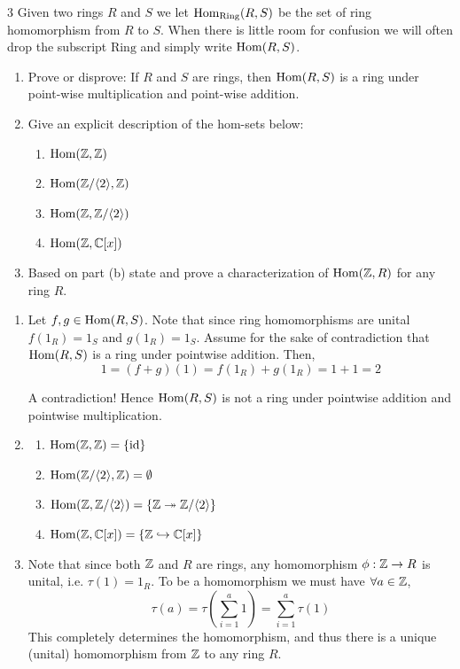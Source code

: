 \documentclass[Notebook.tex]{subfiles}
\begin{document}
\newpage

\begin{problem}{3}
    Given two rings $R$ and $S$ we let $\operatorname{Hom}_{\text{Ring}}(R,S)$ be the set of ring homomorphism from $R$ to $S$. When there is little room for confusion we will often drop the subscript $\text{Ring}$ and simply write $\operatorname{Hom}(R,S)$. 
    \begin{enumerate}[label=(\alph*),ref=\theenumi\alph*]
		\item Prove or disprove: If $R$ and $S$ are rings, then $\operatorname{Hom}(R,S)$ is a ring under point-wise multiplication and point-wise addition. 
		\item Give an explicit description of the hom-sets below:
		\begin{enumerate}
			\item $\operatorname{Hom}(\mathbb Z, \mathbb Z)$
			\item $\operatorname{Hom}(\mathbb Z/\langle 2 \rangle, \mathbb Z)$
			\item $\operatorname{Hom}(\mathbb Z, \mathbb Z/\langle 2 \rangle)$
			\item $\operatorname{Hom}(\mathbb Z, \mathbb C[x])$
		\end{enumerate}
		\item Based on part (b) state and prove a characterization of $\operatorname{Hom}(\mathbb Z,R)$ for any ring $R$. 
	\end{enumerate}
\end{problem}

\begin{solution}
    \bbni 
    \begin{enumerate}[label=(\alph*),ref=\theenumi\alph*]
        \item Let $f, g \in \operatorname{Hom}(R,S)$. Note that since ring homomorphisms are unital $f(1_R) = 1_S$ and $g(1_R) = 1_S$. Assume for the sake of contradiction that $\operatorname{Hom}(R,S)$ is a ring under pointwise addition. Then, \[1 = (f+g)(1) = f(1_R) + g(1_R) = 1 + 1 = 2\]
        
        A contradiction! Hence $\operatorname{Hom}(R,S)$ is not a ring under pointwise addition and pointwise multiplication. 

        \item  
        \begin{enumerate}[label=(\roman*),ref=\theenumi\roman*]
           \item $\operatorname{Hom}(\mathbb Z, \mathbb Z) = \{\operatorname{id}\}$ 
			\item $\operatorname{Hom}(\mathbb Z/\langle 2 \rangle, \mathbb Z) = \emptyset$
			\item $\operatorname{Hom}(\mathbb Z, \mathbb Z/\langle 2 \rangle) = \{\mathbb Z \twoheadrightarrow \mathbb Z/\langle 2 \rangle \}$
			\item $\operatorname{Hom}(\mathbb Z, \mathbb C[x]) = \{\mathbb Z \hookrightarrow \mathbb C[x]\}$
        \end{enumerate}

        \item Note that since both $\mathbb Z$ and $R$ are rings, any homomorphism $\phi: \mathbb Z  \to R$ is unital, i.e. $\tau(1) = 1_R$. To be a homomorphism we must have $\forall a \in \mathbb Z$, 
        \[\tau(a) = \tau\left(\sum_{i=1}^a 1\right) = \sum_{i=1}^a\tau (1)\]
        This completely determines the homomorphism, and thus there is a unique (unital) homomorphism from $\mathbb Z$ to any ring $R$. 
    \end{enumerate}
\end{solution}
\end{document}
